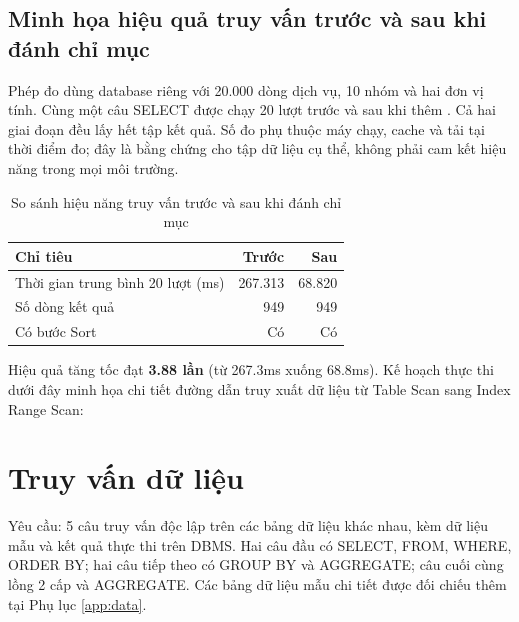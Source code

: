 \subsection{Minh họa hiệu quả truy vấn trước và sau khi đánh chỉ mục}
Phép đo dùng database riêng với 20.000 dòng dịch vụ, 10 nhóm và hai đơn vị tính. Cùng một câu SELECT được chạy 20 lượt trước và sau khi thêm . Cả hai giai đoạn đều lấy hết tập kết quả. Số đo phụ thuộc máy chạy, cache và tải tại thời điểm đo; đây là bằng chứng cho tập dữ liệu cụ thể, không phải cam kết hiệu năng trong mọi môi trường.
\begin{table}[H]\centering\caption{So sánh hiệu năng truy vấn trước và sau khi đánh chỉ mục}\begin{tabularx}{\linewidth}{@{}Yrr@{}}\toprule\textbf{Chỉ tiêu}&\textbf{Trước}&\textbf{Sau}\\\midrule
Thời gian trung bình 20 lượt (ms)&267.313&68.820\\
Số dòng kết quả&949&949\\
Có bước Sort&Có&Có\\\bottomrule\end{tabularx}\end{table}
Hiệu quả tăng tốc đạt \textbf{3.88 lần} (từ 267.3ms xuống 68.8ms). Kế hoạch thực thi dưới đây minh họa chi tiết đường dẫn truy xuất dữ liệu từ Table Scan sang Index Range Scan:
\section{Truy vấn dữ liệu}\label{sec:queries}
Yêu cầu: 5 câu truy vấn độc lập trên các bảng dữ liệu khác nhau, kèm dữ liệu mẫu và kết quả thực thi trên DBMS. Hai câu đầu có SELECT, FROM, WHERE, ORDER BY; hai câu tiếp theo có GROUP BY và AGGREGATE; câu cuối cùng lồng 2 cấp và AGGREGATE. Các bảng dữ liệu mẫu chi tiết được đối chiếu thêm tại Phụ lục \ref{app:data}.

